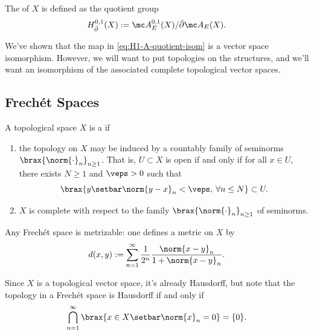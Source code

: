 \documentclass[11pt]{report}
\begin{document}
\begin{defn}
The  of $X$ is defined as the quotient group
\[
H_{\bar \partial}^{0,1}(X) := \mc A_E^{0,1}(X)/ \bar \partial  \mc A_E(X).
\]
\end{defn}

\begin{rmk}
We've shown that the map in \eqref{eq:H1-A-quotient-isom} is a vector space isomorphism. However, we will want to put topologies on the structures, and we'll want an isomorphism of the associated complete topological vector spaces.
\end{rmk}

\subsection{Frech\'{e}t Spaces}

\begin{defn}
A topological space $X$ is a  if 
\begin{enumerate}
    \item[(i)] the topology on $X$ may be induced by a countably family of seminorms $\brax{\norm{\cdot}_n}_{n \geq 1}$. That is, $U \subset X$ is open if and only if for all $x \in U$, there exists $N \geq 1$ and $\veps >0$ such that
\[
\brax{ y \setbar \norm{y-x}_n < \veps, \: \forall n \leq N } \subset U.
\]
    \item[(ii)] $X$ is complete with respect to the family $\brax{\norm{\cdot}_n}_{n \geq 1}$ of seminorms.
\end{enumerate}
\end{defn}

\begin{prop}
Any Frech\'{e}t space is metrizable: one defines a metric on $X$ by
\[
d(x,y):= \sum_{n=1}^\infty \frac{1}{2^n}\frac{\norm{x-y}_n}{1+\norm{x-y}_n}.
\]
\end{prop}

\begin{rmk}
Since $X$ is a topological vector space, it's already Hausdorff, but note that the topology in a Frech\'{e}t space is Hausdorff if and only if
\[
\bigcap_{n=1}^\infty \brax{ x \in X \setbar \norm{x}_n=0 } = \{0\}.
\]
\end{rmk}
\end{document}
